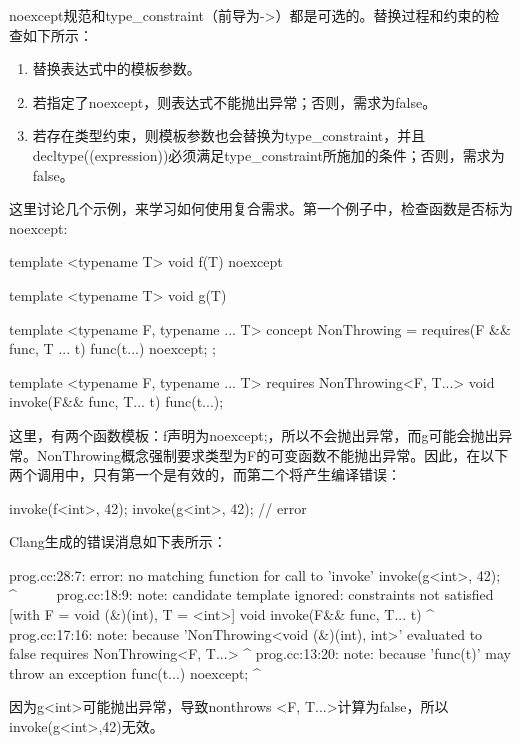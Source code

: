 noexcept规范和type\_constraint（前导为->）都是可选的。替换过程和约束的检查如下所示：

\begin{enumerate}
\item
替换表达式中的模板参数。

\item
若指定了noexcept，则表达式不能抛出异常；否则，需求为false。

\item
若存在类型约束，则模板参数也会替换为type\_constraint，并且decltype((expression))必须满足type\_constraint所施加的条件；否则，需求为false。
\end{enumerate}

这里讨论几个示例，来学习如何使用复合需求。第一个例子中，检查函数是否标为noexcept:

\begin{cpp}
template <typename T>
void f(T) noexcept {}

template <typename T>
void g(T) {}

template <typename F, typename ... T>
concept NonThrowing = requires(F && func, T ... t)
{
	{func(t...)} noexcept;
};

template <typename F, typename ... T>
	requires NonThrowing<F, T...>
void invoke(F&& func, T... t)
{
	func(t...);
}
\end{cpp}

这里，有两个函数模板：f声明为noexcept;，所以不会抛出异常，而g可能会抛出异常。NonThrowing概念强制要求类型为F的可变函数不能抛出异常。因此，在以下两个调用中，只有第一个是有效的，而第二个将产生编译错误：

\begin{cpp}
invoke(f<int>, 42);
invoke(g<int>, 42); // error
\end{cpp}

Clang生成的错误消息如下表所示：

\begin{shell}
prog.cc:28:7: error: no matching function for call to 'invoke'
      invoke(g<int>, 42);
       ^~~~~~
prog.cc:18:9: note: candidate template ignored: constraints not
satisfied [with F = void (&)(int), T = <int>]
   void invoke(F&& func, T... t)
          ^
prog.cc:17:16: note: because 'NonThrowing<void (&)(int), int>'
evaluated to false
      requires NonThrowing<F, T...>
                  ^
prog.cc:13:20: note: because 'func(t)' may throw an exception
      {func(t...)} noexcept;
                       ^
\end{shell}

因为g<int>可能抛出异常，导致nonthrows <F, T...>计算为false，所以invoke(g<int>,42)无效。

